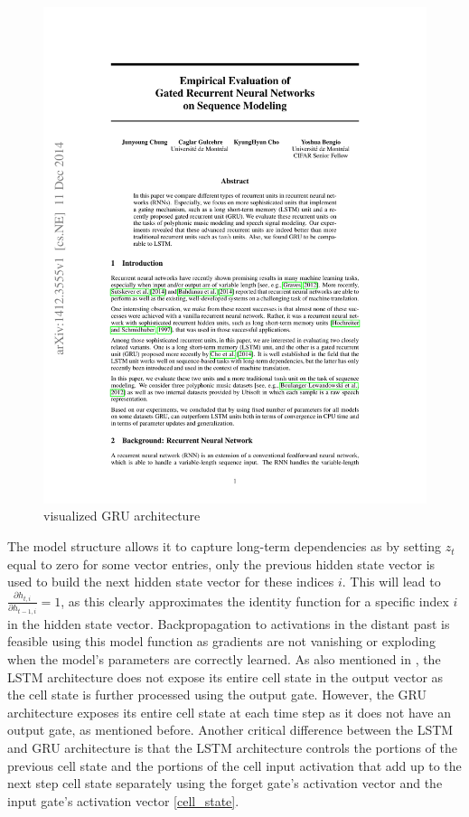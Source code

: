\documentclass[draft,final]{vutinfth} %
\begin{document}
\begin{figure}[H]
\centering{}
\includegraphics[page=3,width=0.8\linewidth,trim={300 590 125 80},clip]{literature/empirical_evaluation_of_gated_recurrent_neural_networks_on_sequence_modeling.pdf}
\caption{visualized GRU architecture \cite[p. 3]{GRU}}
\label{fig:gru_vis}
\end{figure}
The model structure allows it to capture long-term dependencies as by setting $z_t$ equal to zero for some vector entries, only the previous hidden state vector is used to build the next hidden state vector for these indices $i$.
This will lead to $\frac{\partial{h_{t,i}}}{\partial{h_{t-1,i}}} = 1$, as this clearly approximates the identity function for a specific index $i$ in the hidden state vector.
Backpropagation to activations in the distant past is feasible using this model function as gradients are not vanishing or exploding when the model's parameters are correctly learned.
As also mentioned in \cite[p. 5]{GRU}, the LSTM architecture does not expose its entire cell state in the output vector as the cell state is further processed using the output gate.
However, the GRU architecture exposes its entire cell state at each time step as it does not have an output gate, as mentioned before.
Another critical difference between the LSTM and GRU architecture is that the LSTM architecture controls the portions of the previous cell state and the portions of the cell input activation that add up to the next step cell state separately using the forget gate's activation vector and the input gate's activation vector \ref{cell_state}.
\end{document}
